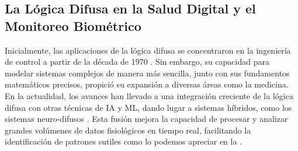 \subsection{La Lógica Difusa en la Salud Digital y el Monitoreo Biométrico}
\label{subsec:logica_difusa_salud_digital}

Inicialmente, las aplicaciones de la lógica difusa se concentraron en la ingeniería de control a partir de la década de 1970 \cite{Strefezza2009Logica}. Sin embargo, su capacidad para modelar sistemas complejos de manera más sencilla, junto con sus fundamentos matemáticos precisos, propició su expansión a diversas áreas como la medicina. En la actualidad, los avances han llevado a una integración creciente de la lógica difusa con otras técnicas de IA y ML, dando lugar a sistemas híbridos, como los sistemas neuro-difusos \cite{Ahmadi2018Diseases}. Esta fusión mejora la capacidad de procesar y analizar grandes volúmenes de datos fisiológicos en tiempo real, facilitando la identificación de patrones sutiles como lo podemos apreciar en la .

